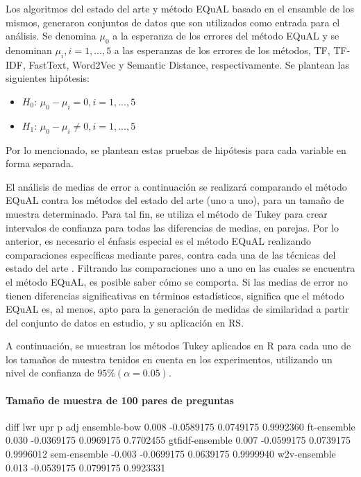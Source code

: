 \bigskip Los algoritmos del estado del arte y método EQuAL basado en el ensamble de los mismos, generaron conjuntos de datos que son utilizados como entrada para el análisis. Se denomina \(\mu_0\) a la esperanza de los errores del método EQuAL y se denominan \(\mu_i, i = 1,..., 5\) a las esperanzas de los errores de los métodos, TF, TF-IDF, FastText, Word2Vec y Semantic Distance, respectivamente. Se plantean las siguientes hipótesis:
\begin{itemize}
	\item \textbf{\(H_0\)}: \(\mu_0 - \mu_i = 0, i = 1,..., 5\)
	\item \textbf{\(H_1\)}: \(\mu_0 - \mu_i \neq 0, i = 1,..., 5\)
\end{itemize}
Por lo mencionado, se plantean estas pruebas de hipótesis para cada variable en forma separada.

\bigskip El análisis de medias de error a continuación se realizará comparando el método EQuAL contra los métodos del estado del arte (uno a uno), para un tamaño de muestra determinado. Para tal fin, se utiliza el método de Tukey para crear intervalos de confianza para todas las diferencias de medias, en parejas. Por lo anterior, es necesario el énfasis especial es el método EQuAL realizando comparaciones específicas mediante pares, contra cada una de las técnicas del estado del arte \citep{abdi2010tukey}. Filtrando las comparaciones uno a uno en las cuales se encuentra el método EQuAL, es posible saber cómo se comporta. Si las medias de error no tienen diferencias significativas en términos estadísticos, significa que el método EQuAL es, al menos, apto para la generación de medidas de similaridad a partir del conjunto de datos en estudio, y su aplicación en RS.

\bigskip A continuación, se muestran los métodos Tukey aplicados en R para cada uno de los tamaños de muestra tenidos en cuenta en los experimentos, utilizando un nivel de confianza de \(95\% (\alpha=0.05)\).

\paragraph{Tamaño de muestra de 100 pares de preguntas}
\begin{rc}
                 diff        lwr       upr     p adj
ensemble-bow     0.008 -0.0589175 0.0749175 0.9992360
ft-ensemble      0.030 -0.0369175 0.0969175 0.7702455
gtfidf-ensemble  0.007 -0.0599175 0.0739175 0.9996012
sem-ensemble    -0.003 -0.0699175 0.0639175 0.9999940
w2v-ensemble     0.013 -0.0539175 0.0799175 0.9923331
\end{rc}

